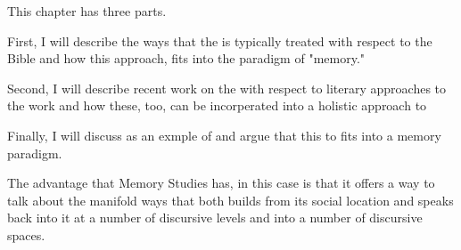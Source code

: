 This chapter has three parts. 

First, I will describe the ways that the \ga is typically treated with respect to the Bible and how this approach, fits into the paradigm of "memory."

Second, I will describe recent work on the \ga with respect to literary approaches to the work and how these, too, can be incorperated into a holistic approach to \ga

Finally, I will discuss \ga as an exmple of \psy and argue that this to fits into a memory paradigm.

The advantage that Memory Studies has, in this case is that it offers a way to talk about the manifold ways that \ga both builds from its social location and speaks back into it at a number of discursive levels and into a number of discursive spaces.